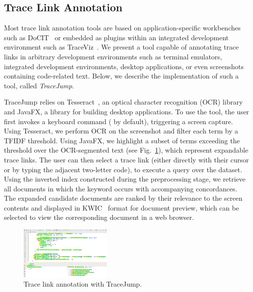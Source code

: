 \documentclass[sigconf,authordraft]{acmart}
\begin{document}
\subsection{Trace Link Annotation}

Most trace link annotation tools are based on application-specific workbenches such as DoCIT~\citep{guo2014towards} or embedded as plugins within an integrated development environment such as TraceViz~\citep{marcus2005and}. We present a tool capable of annotating trace links in arbitrary development environments such as terminal emulators, integrated development environments, desktop applications, or even screenshots containing code-related text. Below, we describe the implementation of such a tool, called \textit{TraceJump}.

TraceJump relies on Tesseract~\citep{smith2007overview}, an optical character recognition (OCR) library and JavaFX, a library for building desktop applications. To use the tool, the user first invokes a keyboard command (\keys{\ctrl + \textbackslash} by default), triggering a screen capture. Using Tesseract, we perform OCR on the screenshot and filter each term by a TFIDF threshold. Using JavaFX, we highlight a subset of terms exceeding the threshold over the OCR-segmented text (see Fig.~\ref{fig:tracejump}), which represent expandable trace links. The user can then select a trace link (either directly with their cursor or by typing the adjacent two-letter code), to execute a query over the dataset. Using the inverted index constructed during the preprocessing stage, we retrieve all documents in which the keyword occurs with accompanying concordances. The expanded candidate documents are ranked by their relevance to the screen contents and displayed in KWIC~\citep{luhn1960key} format for document preview, which can be selected to view the corresponding document in a web browser.

\begin{figure}
    \centering
    \includegraphics[width=0.4\textwidth,keepaspectratio]{trace_links.png}
    \caption{Trace link annotation with TraceJump.}
    \label{fig:tracejump}
\end{figure}
\end{document}
